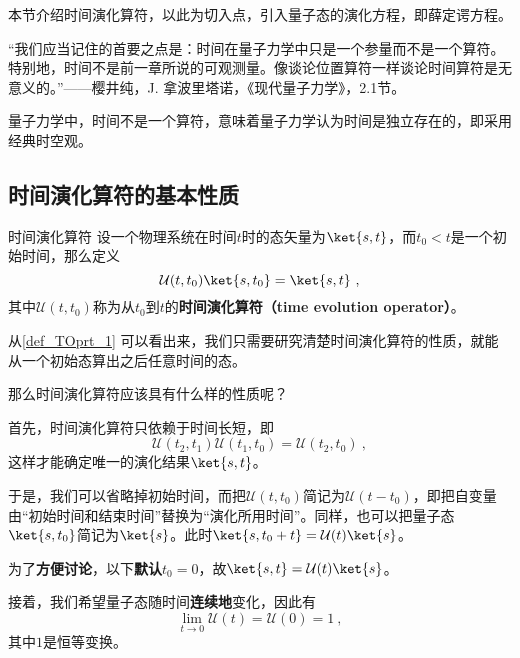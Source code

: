 




本节介绍时间演化算符，以此为切入点，引入量子态的演化方程，即薛定谔方程。


“我们应当记住的首要之点是：时间在量子力学中只是一个参量而不是一个算符。特别地，时间不是前一章所说的可观测量。像谈论位置算符一样谈论时间算符是无意义的。”——樱井纯，J. 拿波里塔诺，《现代量子力学》，2.1节。

量子力学中，时间不是一个算符，意味着量子力学认为时间是独立存在的，即采用经典时空观。


\subsection{时间演化算符的基本性质}

\begin{definition}{时间演化算符}\label{def_TOprt_1}
设一个物理系统在时间$t$时的态矢量为$\ket{s, t}$，而$t_0<t$是一个初始时间，那么定义
\begin{equation}\label{eq_TOprt_1}
\mathcal{U}(t, t_0)\ket{s, t_0}=\ket{s, t}~,
\end{equation}
其中$\mathcal{U}(t, t_0)$称为从$t_0$到$t$的\textbf{时间演化算符（time evolution operator）}。
\end{definition}

从\autoref{def_TOprt_1} 可以看出来，我们只需要研究清楚时间演化算符的性质，就能从一个初始态算出之后任意时间的态。

那么时间演化算符应该具有什么样的性质呢？


首先，时间演化算符只依赖于时间长短，即
\begin{equation}\label{eq_TOprt_2}
\mathcal{U}(t_2, t_1)\mathcal{U}(t_1, t_0) = \mathcal{U}(t_2, t_0)~,
\end{equation}
这样才能确定唯一的演化结果$\ket{s, t}$。

于是，我们可以省略掉初始时间，而把$\mathcal{U}(t, t_0)$简记为$\mathcal{U}(t-t_0)$，即把自变量由“初始时间和结束时间”替换为“演化所用时间”。同样，也可以把量子态$\ket{s, t_0}$简记为$\ket{s}$。此时$\ket{s, t_0+t}=\mathcal{U}(t)\ket{s}$。

为了\textbf{方便讨论}，以下\textbf{默认}$t_0=0$，故$\ket{s, t}=\mathcal{U}(t)\ket{s}$。

接着，我们希望量子态随时间\textbf{连续地}变化，因此有
\begin{equation}\label{eq_TOprt_3}
\lim_{t\to 0}\mathcal{U}(t) = \mathcal{U}(0) = 1~,
\end{equation}
其中$1$是恒等变换。

